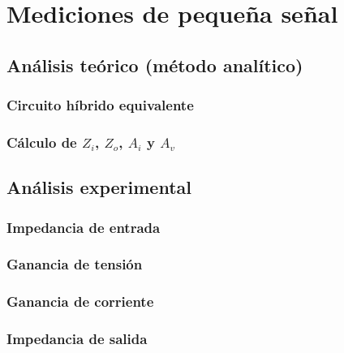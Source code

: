 \documentclass[chaptersright]{informeutn}
\begin{document}
\chapter{Mediciones de pequeña señal}
  \section{Análisis teórico (método analítico)}
    \subsection{Circuito híbrido equivalente}
    \subsection{Cálculo de $Z_i$, $Z_o$, $A_i$ y $A_v$}
  \section{Análisis experimental}
    \subsection{Impedancia de entrada}
    \subsection{Ganancia de tensión}
    \subsection{Ganancia de corriente}
    \subsection{Impedancia de salida}
\end{document}
